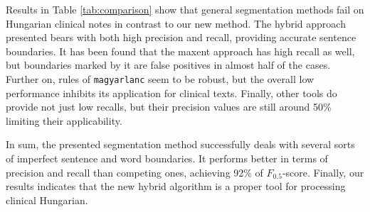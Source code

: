 Results in Table \ref{tab:comparison} show that general segmentation methods fail on Hungarian clinical notes in contrast to our new method. 
The hybrid approach presented bears with both high precision and recall, providing accurate sentence boundaries.
It has been found that the maxent approach has high recall as well, but boundaries marked by it are false positives in almost half of the cases. 
Further on, rules of \texttt{magyarlanc} seem to be robust, but the overall low performance inhibits its application for clinical texts. 
Finally, other tools do provide not just low recalls, but their precision values are still around 50\% limiting their applicability. 

In sum, the presented segmentation method successfully deals with several sorts of imperfect sentence and word boundaries.
It performs better in terms of precision and recall than competing ones, achieving 92\% of $F_{0.5}$-score. 
Finally, our results indicates that the new hybrid algorithm is a proper tool for processing clinical Hungarian.



